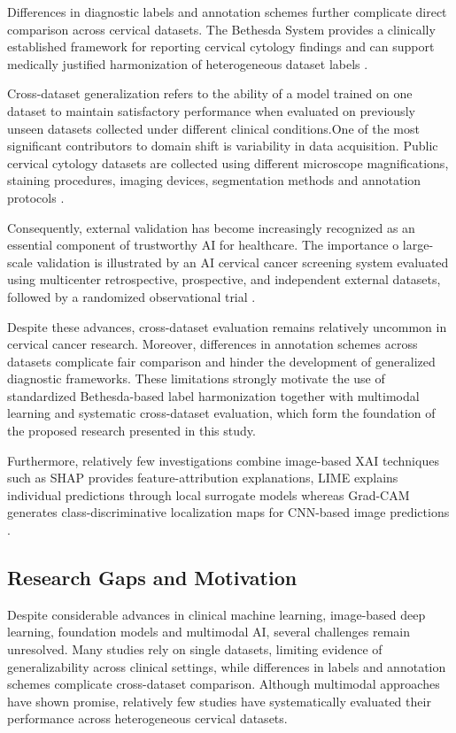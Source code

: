\documentclass{article}
\begin{document}
Differences in diagnostic labels and annotation schemes further complicate direct comparison across cervical datasets. The Bethesda System provides a clinically established framework for reporting cervical cytology findings and can support medically justified harmonization of heterogeneous dataset labels \cite{solomon2002bethesda, nayar2015bethesda}.

Cross-dataset generalization refers to the ability of a model trained on one dataset to maintain satisfactory performance when evaluated on previously unseen datasets collected under different clinical conditions.One of the most significant contributors to domain shift is variability in data acquisition. Public cervical cytology datasets are collected using different microscope magnifications, staining procedures, imaging devices, segmentation methods and annotation protocols \cite{coskun2026robust}. 

Consequently, external validation has become increasingly recognized as an essential component of trustworthy AI for healthcare. The importance o large-scale validation is illustrated by an AI cervical cancer screening system evaluated using multicenter retrospective, prospective, and independent external datasets, followed by a randomized observational trial \cite{wang2024aiccs}.

Despite these advances, cross-dataset evaluation remains relatively uncommon in cervical cancer research. Moreover, differences in annotation schemes across datasets complicate fair comparison and hinder the development of generalized diagnostic frameworks. These limitations strongly motivate the use of standardized Bethesda-based label harmonization together with multimodal learning and systematic cross-dataset evaluation, which form the foundation of the proposed research presented in this study.

Furthermore, relatively few investigations combine image-based XAI techniques such as SHAP provides feature-attribution explanations, LIME explains individual predictions through local surrogate models whereas Grad-CAM generates class-discriminative localization maps for CNN-based image predictions \cite{vallescoral2026review}. 

\subsection{Research Gaps and Motivation}

Despite considerable advances in clinical machine learning, image-based deep learning, foundation models and multimodal AI, several challenges remain unresolved. Many studies rely on single datasets, limiting evidence of generalizability across clinical settings, while differences in labels and annotation schemes complicate cross-dataset comparison. Although multimodal approaches have shown promise, relatively few studies have systematically evaluated their performance across heterogeneous cervical datasets. 
\end{document}
